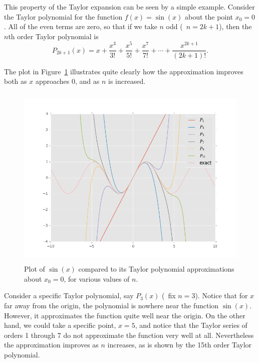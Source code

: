 \begin{example}
  This property of the Taylor expansion can be seen by a simple example.
  Consider the Taylor polynomial for the function
  $f(x)=\sin(x)$ about the point $x_0=0$.  All of the even terms are
  zero, so that if we take $n$ odd (\ie~$n=2k+1$), then the $n$th
  order Taylor polynomial is
  \[
    P_{2k+1}(x)=x+\frac{x^3}{3!}+\frac{x^5}{5!}+\frac{x^7}{7!}+\cdots
    +\frac{x^{2k+1}}{(2k+1)!}. 
    \]

  The plot in Figure~\ref{lab2:fig:taylor-series} illustrates quite clearly
  how the approximation improves both as $x$ approaches 0, and as $n$ is
  increased.  
  \begin{figure}[htbp]
    \begin{center}
      \leavevmode
      \includegraphics[height=3.5in]{taylor/taylor}
    \end{center} 
    \caption{Plot of $\sin(x)$ compared to its Taylor polynomial
      approximations about $x_0=0$, for various values of $n$.}
    \label{lab2:fig:taylor-series}
 \end{figure}
  Consider a specific Taylor polynomial, say $P_3(x)$ (\ie~fix $n=3$).
  Notice that for $x$ far away from the origin, the polynomial is
  nowhere near the function $\sin(x)$.  However, it approximates the
  function quite well near the origin.
  On the other hand, we could take a specific point, $x=5$, and notice
  that the Taylor series of orders 1 through 7 do not approximate the
  function very well at all.  
  Nevertheless the approximation improves as $n$ increases, as is shown
  by the 15th order Taylor polynomial.
\end{example}

